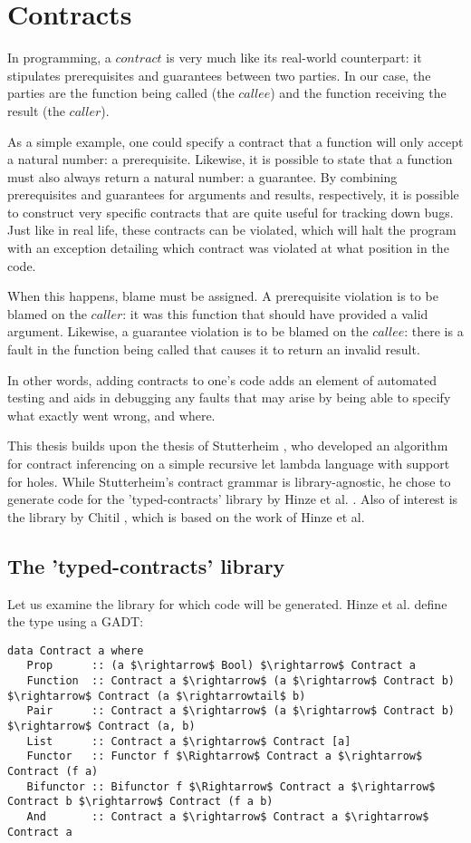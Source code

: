 \documentclass[10pt]{report}
\newcommand{\code}[1]{%
  {%
   \setlength{\fboxsep}{-2\fboxrule}%
   \fcolorbox{black}{light-gray}{\hspace{1.5pt}\strut\texttt{#1}\hspace{1.5pt}}%
  }%
}
\begin{document}
\section{Contracts}
In programming, a $contract$ is very much like its real-world counterpart: it stipulates prerequisites and guarantees between two parties.
In our case, the parties are the function being called (the $callee$) and the function receiving the result (the $caller$).

As a simple example, one could specify a contract that a function will only accept a natural number: a prerequisite.
Likewise, it is possible to state that a function must also always return a natural number: a guarantee.
By combining prerequisites and guarantees for arguments and results, respectively, it is possible to construct very specific contracts that are quite useful for tracking down bugs.
Just like in real life, these contracts can be violated, which will halt the program with an exception detailing which contract was violated at what position in the code.

When this happens, blame must be assigned.
A prerequisite violation is to be blamed on the $caller$: it was this function that should have provided a valid argument.
Likewise, a guarantee violation is to be blamed on the $callee$: there is a fault in the function being called that causes it to return an invalid result.

In other words, adding contracts to one's code adds an element of automated testing and aids in debugging any faults that may arise by being able to specify what exactly went wrong, and where.

This thesis builds upon the thesis of Stutterheim \cite{Stutterheim:2013:thesis}, who developed an algorithm for contract inferencing on a simple recursive let lambda language with support for holes.
While Stutterheim's contract grammar is library-agnostic, he chose to generate code for the 'typed-contracts' library by Hinze et al. \cite{Hinze06typedcontracts}. 
Also of interest is the library by Chitil \cite{Chitil:2012ua}, which is based on the work of Hinze et al.

\subsection{The 'typed-contracts' library}
Let us examine the library for which code will be generated.
Hinze et al. define the \code{Contract} type using a GADT:

\begin{lstlisting}[mathescape]
data Contract a where
   Prop      :: (a $\rightarrow$ Bool) $\rightarrow$ Contract a
   Function  :: Contract a $\rightarrow$ (a $\rightarrow$ Contract b) $\rightarrow$ Contract (a $\rightarrowtail$ b)
   Pair      :: Contract a $\rightarrow$ (a $\rightarrow$ Contract b) $\rightarrow$ Contract (a, b)
   List      :: Contract a $\rightarrow$ Contract [a]
   Functor   :: Functor f $\Rightarrow$ Contract a $\rightarrow$ Contract (f a)
   Bifunctor :: Bifunctor f $\Rightarrow$ Contract a $\rightarrow$ Contract b $\rightarrow$ Contract (f a b)
   And       :: Contract a $\rightarrow$ Contract a $\rightarrow$ Contract a
\end{lstlisting}
\end{document}
